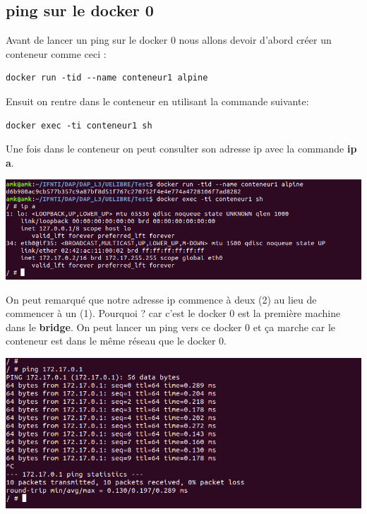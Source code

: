 \documentclass[12pt,a4paper]{article}
\begin{document}
\subsection{ping sur le docker 0}
Avant de lancer un ping sur le docker 0 nous allons devoir d'abord créer un conteneur comme
ceci :
\begin{verbatim}
docker run -tid --name conteneur1 alpine
\end{verbatim}
Ensuit on rentre dans le conteneur en utilisant la commande suivante:
\begin{verbatim}
docker exec -ti conteneur1 sh 
\end{verbatim}
Une fois dans le conteneur on peut consulter son adresse ip avec la commande \textbf{ip a}.
\begin{center}
\includegraphics[scale=0.5]{img/ip_a_c1.png}
\end{center}
On peut remarqué que notre adresse ip commence à deux (2) au lieu de commencer à un (1).
Pourquoi ? car c'est le docker 0 est la première machine dans le \textbf{bridge}. On
peut lancer un ping vers ce docker 0 et ça marche car le conteneur est dans le même 
réseau que le docker 0.
\begin{center}
\includegraphics[scale=0.5]{img/ping_c1.png}
\end{center}
\end{document}
